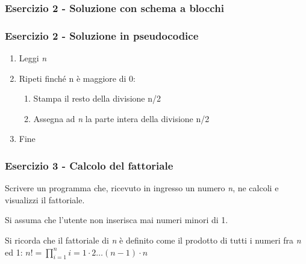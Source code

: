 \documentclass[]{beamer}
\begin{document}
\begin{frame}
\frametitle{Esercizio 2 - Soluzione con schema a blocchi}
\centering
{}
\end{frame}

\begin{frame}
\frametitle{Esercizio 2 - Soluzione in pseudocodice}
\begin{enumerate}
	\item Leggi \emph{n}
	\item Ripeti finché n è maggiore di 0:
	\begin{enumerate}
		\item Stampa il resto della divisione n/2
		\item Assegna ad \emph{n} la parte intera della divisione n/2
	\end{enumerate}
	\item Fine
\end{enumerate}
\end{frame}

\begin{frame}
\frametitle{Esercizio 3 - Calcolo del fattoriale}
Scrivere un programma che, ricevuto in ingresso un numero \emph{n}, ne calcoli e visualizzi il fattoriale.

Si assuma che l'utente non inserisca mai numeri minori di 1.

Si ricorda che il fattoriale di \emph{n} è definito come il prodotto di tutti i numeri fra \emph{n} ed 1: $n! = \prod_{i=1}^{n}i = 1 \cdot 2 \dots (n-1) \cdot n$
\end{frame}
\end{document}
